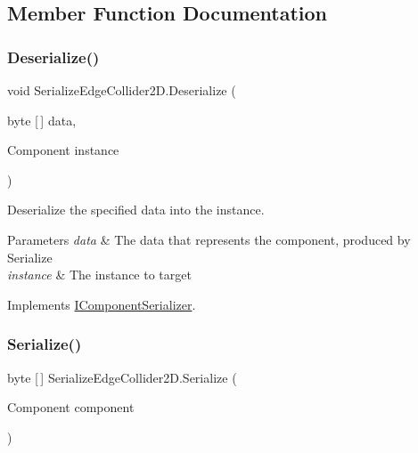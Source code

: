 \subsection{Member Function Documentation}
\mbox{\label{class_serialize_edge_collider2_d_a6abc37b6168840eaea4bf0bdbdc4c624}} 
\subsubsection{\texorpdfstring{Deserialize()}{Deserialize()}}
{\footnotesize\ttfamily void Serialize\+Edge\+Collider2\+D.\+Deserialize (\begin{DoxyParamCaption}\item[{byte \mbox{[}$\,$\mbox{]}}]{data,  }\item[{Component}]{instance }\end{DoxyParamCaption})\hspace{0.3cm}{\ttfamily [inline]}}



Deserialize the specified data into the instance. 


\begin{DoxyParams}{Parameters}
{\em data} & The data that represents the component, produced by Serialize \\
\hline
{\em instance} & The instance to target \\
\hline
\end{DoxyParams}


Implements \hyperlink{interface_i_component_serializer_a4cc366a5c78b33d47a90c209d8fed883}{I\+Component\+Serializer}.

\mbox{\label{class_serialize_edge_collider2_d_aa0efa9c04d2981e21c8d7a66003b1cf9}} 
\subsubsection{\texorpdfstring{Serialize()}{Serialize()}}
{\footnotesize\ttfamily byte \mbox{[}$\,$\mbox{]} Serialize\+Edge\+Collider2\+D.\+Serialize (\begin{DoxyParamCaption}\item[{Component}]{component }\end{DoxyParamCaption})\hspace{0.3cm}{\ttfamily [inline]}}



